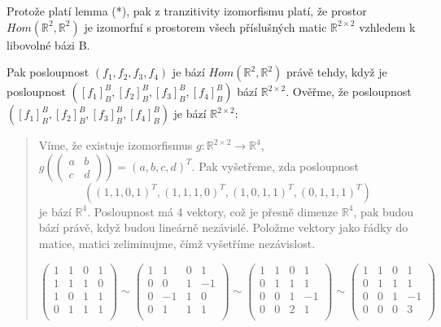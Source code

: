 \documentclass[12pt]{article}
\begin{document}
\begin{enumerate}
    Protože platí lemma (*), pak z tranzitivity izomorfismu platí, že prostor $Hom(\mathbb{R}^2,\mathbb{R}^2)$ 
    je izomorfní s prostorem všech příslušných matic $\mathbb{R}^{2\times2}$ vzhledem k libovolné bázi B.

    Pak posloupnost $(f_1,f_2,f_3,f_4)$ je bází $Hom(\mathbb{R}^2,\mathbb{R}^2)$ právě tehdy, když
    je posloupnost $([f_1]^B_B,[f_2]^B_B,[f_3]^B_B,[f_4]^B_B)$ bází $\mathbb{R}^{2\times2}$.
    Ověřme, že posloupnost $([f_1]^B_B,[f_2]^B_B,[f_3]^B_B,[f_4]^B_B)$ je bází $\mathbb{R}^{2\times2}$:
    
    \begin{quote}
      Víme, že existuje izomorfismus $g: \mathbb{R}^{2\times2} \to \mathbb{R}^4$, $g\left(\left(\begin{array}{cc}
        a & b \\ c & d
      \end{array}\right)\right) = (a,b,c,d)^T$. Pak vyšetřeme, zda posloupnost
        \[
          \left(
            (1,1,0,1)^T, (1,1,1,0)^T, (1,0,1,1)^T, (0,1,1,1)^T
          \right)
        \]
      je bází $\mathbb{R}^4$. Posloupnost má 4 vektory, což je přesně dimenze $\mathbb{R}^4$,
      pak budou bází právě, když budou lineárně nezávislé.
      Položme vektory jako řádky do matice, matici zeliminujme, čímž vyšetříme nezávislost.

      \[
        \left(\begin{array}{cccc}
            1&1&0&1 \\
            1&1&1&0 \\
            1&0&1&1 \\
            0&1&1&1 \\
        \end{array}\right)
        \sim
        \left(\begin{array}{cccc}
            1&1&0&1 \\
            0&0&1&-1 \\
            0&-1&1&0 \\
            0&1&1&1 \\
        \end{array}\right)
         \sim
        \left(\begin{array}{cccc}
            1&1&0&1 \\
            0&1&1&1 \\
            0&0&1&-1 \\
            0&0&2&1 \\
        \end{array}\right)
         \sim
        \left(\begin{array}{cccc}
            1&1&0&1 \\
            0&1&1&1 \\
            0&0&1&-1 \\
            0&0&0&3 \\
        \end{array}\right)
      \]


\end{quote}
\end{enumerate}
\end{document}
